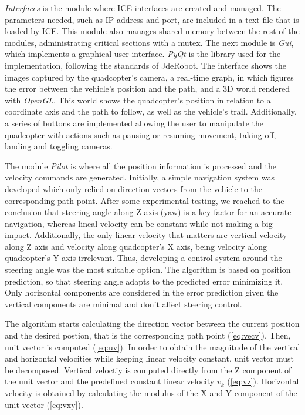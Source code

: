 \documentclass{styles/svproc}
\begin{document}
	\textit{Interfaces} is the module where ICE interfaces are created and managed. The parameters needed, such as IP address and port, are included in a text file that is loaded by ICE. This module also manages shared memory between the rest of the modules, administrating critical sections with a mutex. The next module is \textit{Gui}, which implements a graphical user interface. \textit{PyQt} is the library used for the implementation, following the standards of JdeRobot. The interface shows the images captured by the quadcopter's camera, a real-time graph, in which figures the error between the vehicle's position and the path, and a 3D world rendered with \textit{OpenGL}. This world shows the quadcopter's position in relation to a coordinate axis and the path to follow, as well as the vehicle's trail. Additionally, a series of buttons are implemented allowing the user to manipulate the quadcopter with actions such as pausing or resuming movement, taking off, landing and toggling cameras.
	
	The module \textit{Pilot} is where all the position information is processed and the velocity commands are generated. Initially, a simple navigation system was developed which only relied on direction vectors from the vehicle to the corresponding path point. After some experimental testing, we reached to the conclusion that steering angle along Z axis (yaw) is a key factor for an accurate navigation, whereas lineal velocity can be constant while not making a big impact. Additionally, the only linear velocity that matters are vertical velocity along Z axis and velocity along quadcopter's X axis, being velocity along quadcopter's Y axis irrelevant. Thus, developing a control system around the steering angle was the most suitable option. The algorithm is based on position prediction, so that steering angle adapts to the predicted error minimizing it. Only horizontal components are considered in the error prediction given the vertical components are minimal and don't affect steering control.
	
	The algorithm starts calculating the direction vector between the current position and the desired postion, that is the corresponding path point (\ref{eq:vecv}). Then, unit vector is computed (\ref{eq:uv}). In order to obtain the magnitude of the vertical and horizontal velocities while keeping linear velocity constant, unit vector must be decomposed. Vertical veloctiy is computed directly from the Z component of the unit vector and the predefined constant linear velocity $v_{k}$ (\ref{eq:vz}). Horizontal velocity is obtained by calculating the modulus of the X and Y component of the unit vector (\ref{eq:vxy}).
\end{document}
